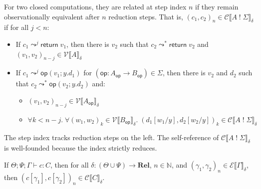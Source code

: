 \documentclass[acmsmall,screen,review,anonymous]{acmart}
\newcommand{\comp}[2]{#1\;!\;#2}
\newcommand{\arity}[2]{#1 \to #2}
\newcommand{\op}{\mathsf{op}}
\newcommand{\ret}{\mathsf{return}\;}
\newcommand{\G}{\Gamma}
\newcommand{\Sig}{\Sigma}
\newcommand{\cjp}[5]{#1; #2; #3 \vdash #4 : #5}
\newcommand{\Rel}{\mathbf{Rel}}
\newcommand{\VV}{\mathcal{V}}
\newcommand{\CC}{\mathcal{C}}
\newcommand{\GG}{\mathcal{E}}
\begin{document}
For two closed computations, they are related at step index $n$ if they remain observationally equivalent after $n$ reduction steps.
That is, $(c_1,c_2)_n \in \CC\llbracket \comp{A}{\Sig} \rrbracket_\delta$ if for all $j < n$:
\begin{itemize}
  \item If $c_1 \leadsto^j \ret v_1$, then there is $v_2$ such that $c_2 \leadsto^* \ret v_2$ and $(v_1, v_2)_{n-j} \in \VV\llbracket A \rrbracket_\delta$
  \item If $c_1 \leadsto^j \op(v_1; y.d_1)$ for $(\op : \arity{A_\op}{B_\op}) \in \Sig$, then there is $v_2$ and $d_2$ such that $c_2 \leadsto^* \op(v_2; y.d_2)$ and:
  \begin{itemize}
    \item $(v_1, v_2)_{n-j} \in \VV\llbracket A_\op \rrbracket_\delta$
    \item $\forall k < n{-}j.\; \forall (w_1, w_2)_k \in \VV\llbracket B_\op \rrbracket_\delta.\; (d_1[w_1/y], d_2[w_2/y])_k \in \CC\llbracket \comp{A}{\Sig} \rrbracket_\delta$
  \end{itemize}
\end{itemize}
The step index tracks reduction steps on the left.
The self-reference of $\CC\llbracket \comp{A}{\Sig} \rrbracket_\delta$ is well-founded because the index strictly reduces.

\begin{theorem}[Parametricity]\label{thm:parametricity}
  If $\cjp{\Theta}{\Psi}{\G}{c}{C}$, then for all $\delta : (\Theta \cup \Psi) \to \Rel$, $n\in\mathbb{N}$,
  and $(\gamma_1, \gamma_2)_n \in \GG\llbracket \G \rrbracket_\delta$,
  then $(c[\gamma_1], c[\gamma_2])_n \in \CC\llbracket C \rrbracket_\delta$.
\end{theorem}
\end{document}
